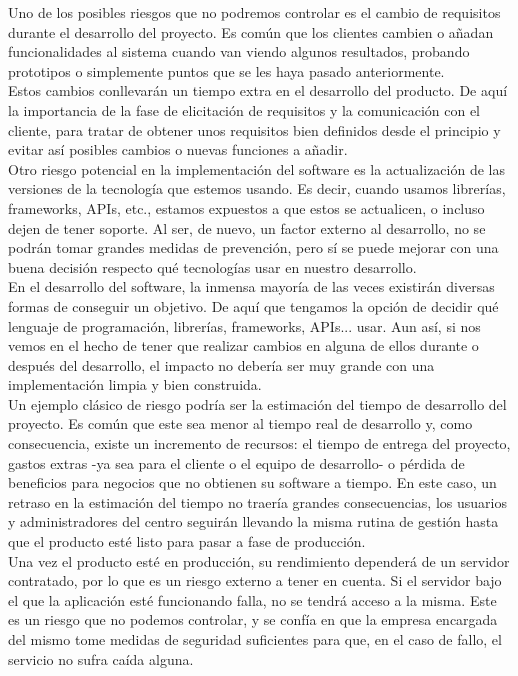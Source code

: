 Uno de los posibles riesgos que no podremos controlar es el cambio de requisitos durante el desarrollo del proyecto. Es común que los clientes cambien o añadan funcionalidades al sistema cuando van viendo algunos resultados, probando prototipos o simplemente puntos que se les haya pasado anteriormente. \\
Estos cambios conllevarán un tiempo extra en el desarrollo del producto. De aquí la importancia de la fase de elicitación de requisitos y la comunicación con el cliente, para tratar de obtener unos requisitos bien definidos desde el principio y evitar así posibles cambios o nuevas funciones a añadir.
\\

Otro riesgo potencial en la implementación del software es la actualización de las versiones de la tecnología que estemos usando. Es decir, cuando usamos librerías, frameworks, APIs, etc., estamos expuestos a que estos se actualicen, o incluso dejen de tener soporte. Al ser, de nuevo, un factor externo al desarrollo, no se podrán tomar grandes medidas de prevención, pero sí se puede mejorar con una buena decisión respecto qué tecnologías usar en nuestro desarrollo. \\
En el desarrollo del software, la inmensa mayoría de las veces existirán diversas formas de conseguir un objetivo. De aquí que tengamos la opción de decidir qué lenguaje de programación, librerías, frameworks, APIs... usar. Aun así, si nos vemos en el hecho de tener que realizar cambios en alguna de ellos durante o después del desarrollo, el impacto no debería ser muy grande con una implementación limpia y bien construida. 
\\

Un ejemplo clásico de riesgo podría ser la estimación del tiempo de desarrollo del proyecto. Es común que este sea menor al tiempo real de desarrollo y, como consecuencia, existe un incremento de recursos: el tiempo de entrega del proyecto, gastos extras -ya sea para el cliente o el equipo de desarrollo- o pérdida de beneficios para negocios que no obtienen su software a tiempo. En este caso, un retraso en la estimación del tiempo no traería grandes consecuencias, los usuarios y administradores del centro seguirán llevando la misma rutina de gestión hasta que el producto esté listo para pasar a fase de producción.
\\

Una vez el producto esté en producción, su rendimiento dependerá de un servidor contratado, por lo que es un riesgo externo a tener en cuenta. Si el servidor bajo el que la aplicación esté funcionando falla, no se tendrá acceso a la misma. Este es un riesgo que no podemos controlar, y se confía en que la empresa encargada del mismo tome medidas de seguridad suficientes para que, en el caso de fallo, el servicio no sufra caída alguna. 


